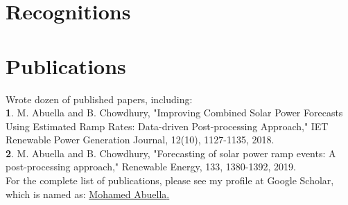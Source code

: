 \documentclass[11pt,letterpaper,sans]{moderncv}
\begin{document}
%
%
%
%
\vspace{-2ex}
\section{Recognitions}
\vspace{-2ex}
\section{Publications}
Wrote dozen of published papers, including:\\
\textbf{1}. M. Abuella and B. Chowdhury, "Improving Combined Solar Power Forecasts Using Estimated Ramp Rates: Data-driven Post-processing Approach," IET Renewable Power Generation Journal, 12(10), 1127-1135, 2018.\\
\textbf{2}. M. Abuella and B. Chowdhury, "Forecasting of solar power ramp events: A post-processing approach," Renewable Energy, 133, 1380-1392, 2019.\\
For the complete list of publications, please see my profile at Google Scholar, which is named as:
\href{https://scholar.google.com/citations?user=nJbFUkcAAAAJ&hl=en}{\underline{\textcolor[rgb]{0.00,0.07,1.00}{Mohamed Abuella}}.}
\end{document}
